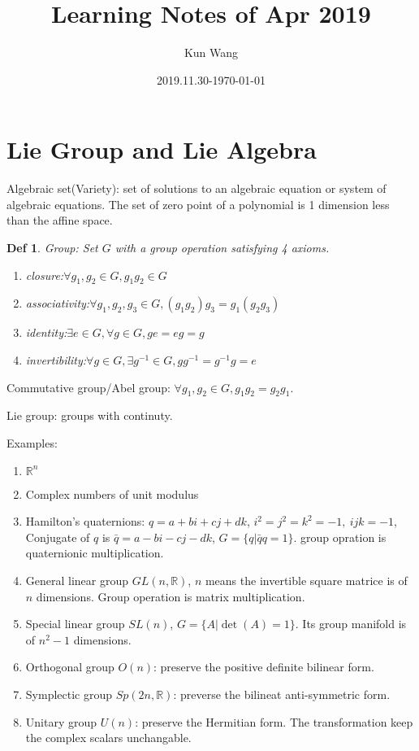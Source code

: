 \documentclass[12pt]{article}
\title{Learning Notes of Apr 2019}
\author{Kun Wang}
\date{2019.11.30-\today}
\newtheorem{definition}{Def}[section]
\begin{document}
        \maketitle

        \section{Lie Group and Lie Algebra}

        Algebraic set(Variety): set of solutions to an algebraic equation or system of algebraic equations.
        The set of zero point of a polynomial is 1 dimension less than the affine space.

        \begin{definition}
         Group: Set $G$ with a group operation satisfying 4 axioms.
        \begin{enumerate}
           \item closure:$\forall g_1,g_2\in G,g_1g_2\in G$
           \item associativity:$\forall g_1,g_2,g_3\in G,(g_1g_2)g_3=g_1(g_2g_3)$
           \item identity:$\exists e\in G,\forall g\in G, ge=eg=g$
           \item invertibility:$\forall g\in G,\exists g^{-1}\in G, gg^{-1}=g^{-1}g=e$
        \end{enumerate}
        \end{definition}
        Commutative group/Abel group: $\forall g_{1},g_{2}\in G,g_{1}g_{2}=g_{2}g_{1}$.
        
        Lie group: groups with continuty.

        Examples:
        \begin{enumerate}
            \item $\mathbb{R}^{n}$
            \item Complex numbers of unit modulus
            \item Hamilton's quaternions: $q=a+bi+cj+dk$, $i^{2}=j^{2}=k^{2}=-1,\ ijk=-1$, 
            Conjugate of $q$ is $\bar{q}=a-bi-cj-dk$, $G=\{q|\bar{q}q=1\}$. 
            group opration is quaternionic multiplication.
            \item General linear group $GL(n,\mathbb{R})$, 
            $n$ means the invertible square matrice is of $n$ dimensions. 
            Group operation is matrix multiplication.
            \item Special linear group $SL(n)$, $G=\{A|\det(A)=1\}$. Its group manifold is of $n^{2}-1$ dimensions.
            \item Orthogonal group $O(n)$: preserve the positive definite bilinear form.
            \item Symplectic group $Sp(2n,\mathbb{R})$: preverse the bilineat anti-symmetric form.
            \item Unitary group $U(n)$: preserve the Hermitian form. The transformation keep the complex scalars unchangable.
        \end{enumerate}
\end{document}
